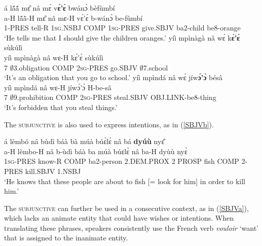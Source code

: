 \begin{exe}
\ex\label{SBJV}
\begin{xlist}
\ex\label{SBJV1}
  \glll   á lã́ã́ mɛ̂ nâ mɛ́ v{\bfseries ɛ́'ɛ̀} bwánɔ̀ bèfùmbí \\
         a-H lã́ã̀-H mɛ̂ nâ mɛ-H vɛ́'ɛ̀ b-wánɔ̀ be-fùmbí \\
             1-PRES tell-R 1\textsc{sg}.NSBJ COMP 1\textsc{sg}-PRES give.SBJV ba2-child be8-orange   \\
    \trans `He tells me that I should give the children oranges.'
\ex \label{SBJV2}
  \glll  yíì mpìnàgà nâ wɛ́ k{\bfseries ɛ́'ɛ̀} sùkúlì \\
         yíì mpìnàgà nâ wɛ-H kɛ́'ɛ̀ sùkúlì\\
              7 $\emptyset$3.obligation COMP 2\textsc{sg}-PRES go.SBJV $\emptyset$7.school \\
    \trans `It's an obligation that you go to school.'
\ex \label{SBJV3}
  \glll  yíì mpìndá nâ wɛ́ jíw{\bfseries ɔ́'ɔ̀} bésâ \\
           yíì mpìndá nâ wɛ-H jíwɔ́'ɔ̀ H-be-sâ\\
              7 $\emptyset$9.prohibition COMP 2\textsc{sg}-PRES steal.SBJV OBJ.LINK-be8-thing \\
    \trans `It's forbidden that you steal things.'
\end{xlist}
\end{exe}

The \textsc{subjunctive} is also used to express intentions, as in (\ref{SBJVb}). 

\begin{exe} 
\ex\label{SBJVb}
  \glll   á lèmbó nâ bùdì báà bà múà búɛ̀lɛ̀ nâ bá {\bfseries dyúù} nyɛ̂  \\
          a-H lèmbo-H nâ b-ùdì báà ba múà búɛlɛ̀ nâ ba-H dyùù nyɛ̀  \\
1\textsc{sg}-PRES know-R COMP ba2-person 2.DEM.PROX 2 PROSP fish COMP 2-PRES kill.SBJV 1.NSBJ   \\
    \trans `He knows that these people are about to fish [= look for him] in order to kill him.'
\end{exe}

The \textsc{subjunctive} can further be used in a consecutive context, as in (\ref{SBJVa}), which lacks an animate entity that could have wishes or intentions. When translating these phrases, speakers consistently use the French verb {\itshape vouloir} `want' that is assigned to the inanimate entity. %

